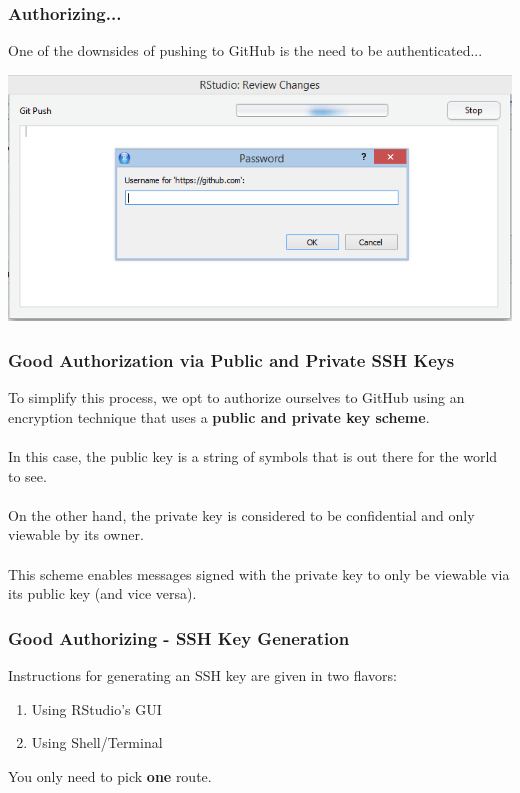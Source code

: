 \documentclass{beamer}\usepackage[]{graphicx}\usepackage[]{color}
\begin{document}
\begin{frame}
\frametitle{Authorizing...}
One of the downsides of pushing to GitHub is the need to be authenticated...
\begin{center}
\includegraphics[scale=0.36]{img/project/review_changes.png}
\end{center}

\end{frame}

\begin{frame}[fragile]
\frametitle{Good Authorization via Public and Private SSH Keys}

To simplify this process, we opt to authorize ourselves to GitHub using an encryption technique that uses a \textbf{public and private key scheme}.
\\$ $\\
In this case, the public key is a string of symbols that is out there for the world to see. 
\\$ $\\
On the other hand, the private key is considered to be confidential and only viewable by its owner. 
\\$ $\\
This scheme enables messages signed with the private key to only be viewable via its public key (and vice versa).

\end{frame}



\begin{frame}[fragile]
\frametitle{Good Authorizing - SSH Key Generation}

Instructions for generating an SSH key are given in two flavors:

\begin{enumerate}
\item Using RStudio's GUI
\item Using Shell/Terminal
\end{enumerate}

You only need to pick \textbf{one} route.

\end{frame}
\end{document}
